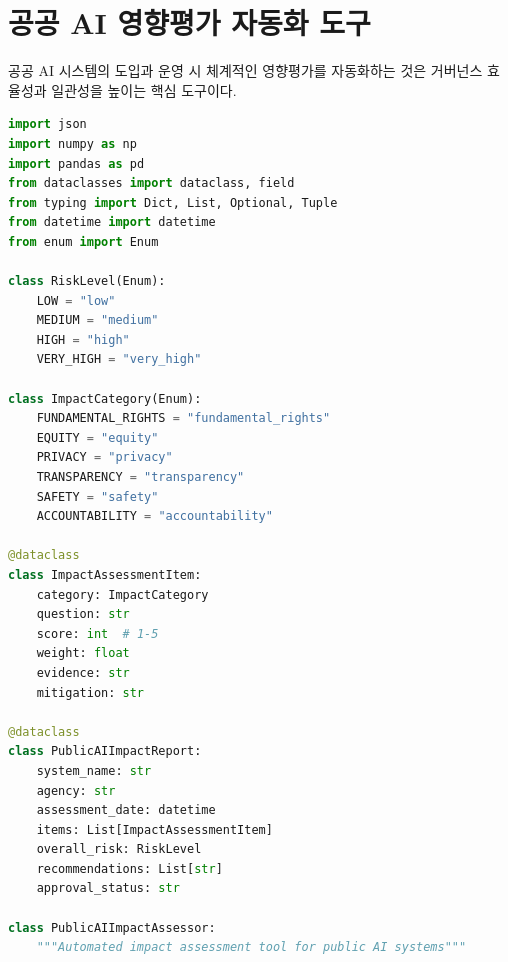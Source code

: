 \section{공공 AI 영향평가 자동화 도구}
\label{sec:18.3.3}

공공 AI 시스템의 도입과 운영 시 체계적인 영향평가를 자동화하는 것은 거버넌스 효율성과 일관성을 높이는 핵심 도구이다.

\begin{lstlisting}[language=Python, caption={Public AI Impact Assessment Automation Tool}, label={lst:public_impact}]
import json
import numpy as np
import pandas as pd
from dataclasses import dataclass, field
from typing import Dict, List, Optional, Tuple
from datetime import datetime
from enum import Enum

class RiskLevel(Enum):
    LOW = "low"
    MEDIUM = "medium"
    HIGH = "high"
    VERY_HIGH = "very_high"

class ImpactCategory(Enum):
    FUNDAMENTAL_RIGHTS = "fundamental_rights"
    EQUITY = "equity"
    PRIVACY = "privacy"
    TRANSPARENCY = "transparency"
    SAFETY = "safety"
    ACCOUNTABILITY = "accountability"

@dataclass
class ImpactAssessmentItem:
    category: ImpactCategory
    question: str
    score: int  # 1-5
    weight: float
    evidence: str
    mitigation: str

@dataclass
class PublicAIImpactReport:
    system_name: str
    agency: str
    assessment_date: datetime
    items: List[ImpactAssessmentItem]
    overall_risk: RiskLevel
    recommendations: List[str]
    approval_status: str

class PublicAIImpactAssessor:
    """Automated impact assessment tool for public AI systems"""


\end{lstlisting}
